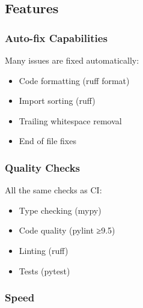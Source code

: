 \subsection{Features}\label{cr:app:archive-pre-commit-setup-summary:features}

\subsubsection{Auto-fix Capabilities}\label{cr:app:archive-pre-commit-setup-summary:auto-fix-capabilities}

\begin{record}

Many issues are fixed automatically:

\begin{itemize}
\tightlist
\item
  \ok{} Code formatting (ruff format)
\item
  \ok{} Import sorting (ruff)
\item
  \ok{} Trailing whitespace removal
\item
  \ok{} End of file fixes
\end{itemize}

\end{record}

\subsubsection{Quality Checks}\label{cr:app:archive-pre-commit-setup-summary:quality-checks}

\begin{record}

All the same checks as CI:

\begin{itemize}
\tightlist
\item
  \ok{} Type checking (mypy)
\item
  \ok{} Code quality (pylint ≥9.5)
\item
  \ok{} Linting (ruff)
\item
  \ok{} Tests (pytest)
\end{itemize}

\end{record}

\subsubsection{Speed}\label{cr:app:archive-pre-commit-setup-summary:speed}

